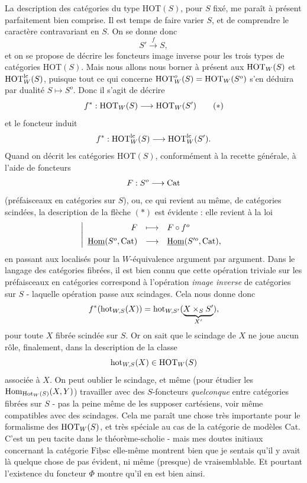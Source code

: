 La description des catégories du type HOT$(S)$, pour $S$ fixé, me paraît à présent parfaitement bien comprise. Il est temps de faire varier $S$, et de comprendre le caractère contravariant en $S$. On se donne donc
\[S' \xrightarrow{f} S,\]
et on se propose de décrire les foncteurs image inverse pour les trois types de catégories HOT$(S)$. Mais nous allons nous borner à présent aux $\mathrm{HOT}_W(S)$ et $\mathrm{HOT}^{\mathrm{lc}}_W(S)$, puisque tout ce qui concerne $\mathrm{HOT}^o_W(S) = \mathrm{HOT}_W(S^o)$ s'en déduira par dualité $S \longmapsto S^o$. Donc il s'agit de décrire
\[f^* : \HOT_W(S) \longrightarrow \HOT_W(S') \tag*{$(*)$}\]
et le foncteur induit
\[f^* : \mathrm{HOT}^{\mathrm{lc}}_W(S) \longrightarrow \mathrm{HOT}^{\mathrm{lc}}_W(S').\]
Quand on décrit les catégories HOT$(S)$, conformément à la recette générale, à l'aide de foncteurs
\[F : S^o \longrightarrow \mathrm{Cat}\]
(préfaisceaux en catégories sur $S$), ou, ce qui revient au même, de catégories scindées, la description de la flèche $(*)$ est évidente : elle revient à la loi
\[\left|\begin{array}{rcl}
F & \longmapsto & F \circ f^o \\[1ex]
\underline{\mathrm{Hom}}(S^o, \mathrm{Cat}) & \longrightarrow & \underline{\mathrm{Hom}}(S'^o, \mathrm{Cat}),
\end{array}\right.\]
en passant aux localisés pour la $W$-équivalence argument par argument. Dans le langage des catégories fibrées, il est bien connu que cette opération triviale sur les préfaisceaux en catégories correspond à l'opération \textit{image inverse} de catégories sur $S$ - laquelle opération passe aux scindages. Cela nous donne donc
\[f^*(\mathrm{hot}_{W,S}(X)) = \mathrm{hot}_{W,S'}(\underbrace{X \times_S S'}_{X'}),\]
pour toute $X$ fibrée scindée sur $S$. Or on sait que le scindage de $X$ ne joue aucun rôle, finalement, dans la description de la classe
\[\mathrm{hot}_{W,S}(X) \in \mathrm{HOT}_W(S)\]
associée à $X$. On peut oublier le scindage, et même (pour étudier les $\operatorname{Hom}_{\mathrm{Hot}_W(S)}(X, Y)$) travailler avec des $S$-foncteurs \textit{quelconque} entre catégories fibrées sur $S$ - pas la peine même de les supposer cartésiens, voir même compatibles avec des scindages. Cela me paraît une chose très importante pour le formalisme des $\mathrm{HOT}_W(S)$, et très spéciale au cas de la catégorie de modèles Cat. C'est un peu tacite dans le théorème-scholie - mais mes doutes initiaux concernant la catégorie $\underline{\mathrm{Fibsc}}$ elle-même montrent bien que je sentais qu'il y avait là quelque chose de pas évident, ni même (presque) de vraisemblable. Et pourtant l'existence du foncteur $\Phi$ montre qu'il en est bien ainsi.

